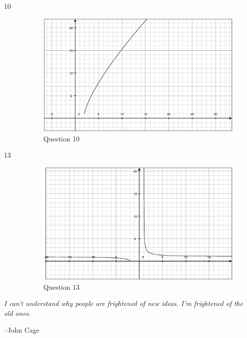 \documentclass[fleqn,addpoints]{exam}
\begin{document}
\begin{description}
\item[10]
\begin{figure}[H]
  \centering
  \includegraphics[scale=.3]{question10.eps}
  \caption*{Question 10}
\end{figure}

\item[13]
\begin{figure}[H]
  \centering
  \includegraphics[scale=.3]{question13.eps}
  \caption*{Question 13}
\end{figure}

\end{description}

\ifprintanswers
\else

\vspace{4 in}

{\em I can't understand why people are frightened of new ideas. I'm frightened of the old ones.}

\vspace{.1 cm}
\hspace{1 cm} --John Cage
\fi
\end{document}
